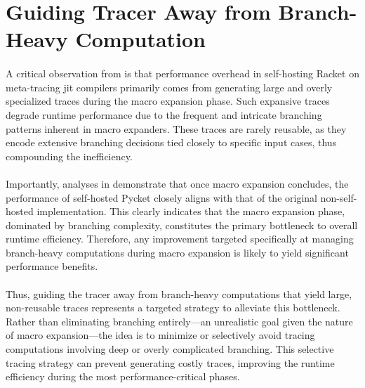 	\section[\texorpdfstring{Guiding Tracer Away from Branch-Heavy Computation}{Hot Branches}]{Guiding Tracer Away from Branch-Heavy Computation}
    \label{section:hot-branches}

    \paragraph{}%
      A critical observation from  is that performance overhead in self-hosting Racket on meta-tracing \gls{jit} compilers primarily comes from generating large and overly specialized traces during the macro expansion phase. Such expansive traces degrade runtime performance due to the frequent and intricate branching patterns inherent in macro expanders. These traces are rarely reusable, as they encode extensive branching decisions tied closely to specific input cases, thus compounding the inefficiency.

    \paragraph{}%
      Importantly, analyses in  demonstrate that once macro expansion concludes, the performance of self-hosted Pycket closely aligns with that of the original non-self-hosted implementation. This clearly indicates that the macro expansion phase, dominated by branching complexity, constitutes the primary bottleneck to overall runtime efficiency. Therefore, any improvement targeted specifically at managing branch-heavy computations during macro expansion is likely to yield significant performance benefits.

    \paragraph{}%
      Thus, guiding the tracer away from branch-heavy computations that yield large, non-reusable traces represents a targeted strategy to alleviate this bottleneck. Rather than eliminating branching entirely—an unrealistic goal given the nature of macro expansion—the idea is to minimize or selectively avoid tracing computations involving deep or overly complicated branching. This selective tracing strategy can prevent generating costly traces, improving the runtime efficiency during the most performance-critical phases.

